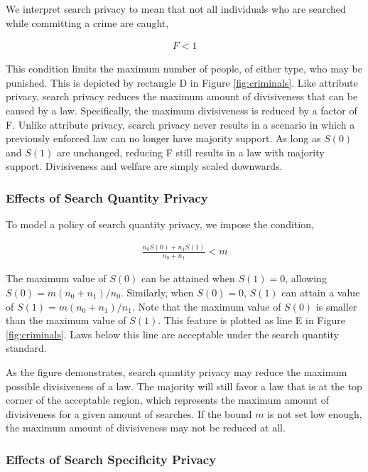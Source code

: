 We interpret search privacy to mean that not all individuals who are searched while committing a crime are caught, 

\begin{align}
F<1
\end{align}

This condition limits the maximum number of people, of either type, who may be punished.  This is depicted by rectangle D in Figure \ref{fig:criminals}.  Like attribute privacy, search privacy reduces the maximum amount of divisiveness that can be caused by a law.  Specifically, the maximum divisiveness is reduced by a factor of F.  Unlike attribute privacy, search privacy never results in a scenario in which a previously enforced law can no longer have majority support.  As long as $S(0)$ and $S(1)$ are unchanged, reducing F still results in a law with majority support.  Divisiveness and welfare are simply scaled downwards.

\subsubsection{Effects of Search Quantity Privacy}

To model a policy of search quantity privacy, we impose the condition, 

\begin{align}
\frac{n_0 S(0) + n_1 S(1)}{n_0 + n_1}  < m
\end{align}

The maximum value of $S(0)$ can be attained when $S(1) = 0$, allowing $S(0) = m (n_0 + n_1)/n_0$.  Similarly, when $S(0) = 0$, $S(1)$ can attain a value of $S(1) = m (n_0 + n_1)/n_1$.   Note that the maximum value of $S(0)$ is smaller than the maximum value of $S(1)$.  This feature is plotted as line E in Figure \ref{fig:criminals}.  Laws below this line are acceptable under the search quantity standard.  

As the figure demonstrates, search quantity privacy may reduce the maximum possible divisiveness of a law.  The majority will still favor a law that is at the top corner of the acceptable region, which represents the maximum amount of divisiveness for a given amount of searches.  If the bound $m$ is not set low enough, the maximum amount of divisiveness may not be reduced at all.

\subsubsection{Effects of Search Specificity Privacy}

